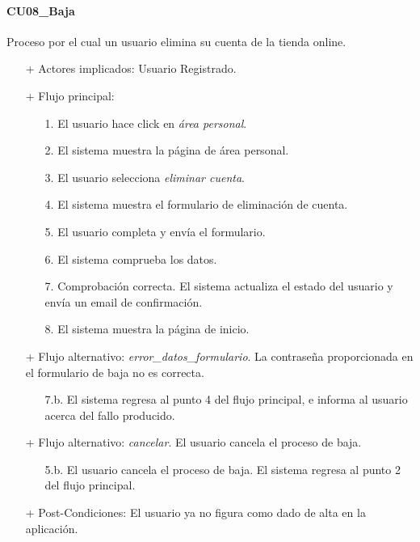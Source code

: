 \documentclass[a4paper]{article}
\begin{document}
            \paragraph{CU08\_Baja}
                Proceso por el cual un usuario elimina su cuenta de la tienda online.
                \begin{itemize}
                    \item[+] Actores implicados: Usuario Registrado.
                    \item[+] Flujo principal:
                    \begin{enumerate}
                        \item[1.] El usuario hace click en \emph{área personal}.
                        \item[2.] El sistema muestra la página de área personal.
                        \item[3.] El usuario selecciona \emph{eliminar cuenta}.
                        \item[4.] El sistema muestra el formulario de eliminación de cuenta.
                        \item[5.] El usuario completa y envía el formulario.
                        \item[6.] El sistema comprueba los datos.
                        \item[7.] Comprobación correcta. El sistema actualiza el estado del usuario y envía un email de confirmación.
                        \item[8.] El sistema muestra la página de inicio.
                    \end{enumerate}
                    \item[+] Flujo alternativo: \emph{error\_datos\_formulario}. La contraseña proporcionada en el formulario de baja no es correcta.
                    \begin{itemize}
                        \item[7.b.] El sistema regresa al punto 4 del flujo principal, e informa al usuario acerca del fallo producido.
                    \end{itemize}
                    \item[+] Flujo alternativo: \emph{cancelar}. El usuario cancela el proceso de baja.
                    \begin{itemize}
                        \item[5.b.] El usuario cancela el proceso de baja. El sistema regresa al punto 2 del flujo principal.
                    \end{itemize}
                    \item[+] Post-Condiciones: El usuario ya no figura como dado de alta en la aplicación.
                \end{itemize}
\end{document}

